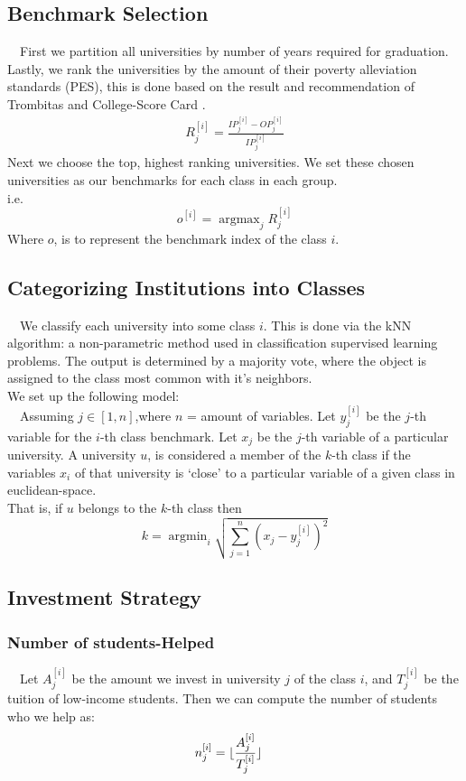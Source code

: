 \documentclass[12pt]{scrartcl}
\DeclarePairedDelimiter\floor{\lfloor}{\rfloor}
\newcommand{\argmax}{\mathop{\mathrm{argmax}}}
\newcommand{\argmin}{\mathop{\mathrm{argmin}}}
\begin{document}
	\subsection{Benchmark Selection}
		\ \ First we partition all universities by number of years required for graduation. Lastly, we rank the universities by the amount of their poverty alleviation standards (PES), this is done based on the result and recommendation of Trombitas \cite{Trom} and College-Score Card \cite{US}.\\ 
		\begin{align}
			R_j^{[i]}=\frac{IP_j^{[i]}-OP_j^{[i]}}{IP_j^{[i]}}
		\end{align}
		Next we choose the top, highest ranking universities. We set these chosen universities as our benchmarks for each class in each group.\\
		i.e.
		$$
			o^{[i]} = \argmax_{j} R_j^{[i]}
		$$
		Where $o$, is to represent the benchmark index of the class $i$.

	\subsection{Categorizing Institutions into Classes}
		\ \ We classify each university into some class $i$. This is done via the kNN algorithm: a non-parametric method used in classification supervised learning problems. The output is determined by a majority vote, where the object is assigned to the class most common with it's neighbors. \cite{Hastie}\\
		We set up the following model:\\

		\ \ Assuming $j\in [1,n]$,where $n$ = amount of variables. Let $y_j^{[i]}$ be the $j$-th variable for the $i$-th class benchmark. Let $x_j$ be the $j$-th variable of a particular university. A university $u$, is considered a member of the $k$-th class if the variables $x_i$ of that university is `close' to a particular variable of a given class in euclidean-space.\\
	
		That is, if $u$ belongs to the $k$-th class then
		$$
			k = \argmin_{i} \sqrt{ \sum_{j=1}^n (x_j-y_j^{[i]})^2 }
		$$

	
	\subsection{Investment Strategy}

	\subsubsection{Number of students-Helped}
		\ \ Let $A_j^{[i]}$ be the amount we invest in university $j$ of the class $i$, and $T_j^{[i]}$ be the tuition of low-income students. Then we can compute the number of students who we help as:
		\begin{align}
			n_j^{[i]} &= \floor{\frac{A_j^{[i]}}{T_j^{[i]}}}
		\end{align}
\end{document}
